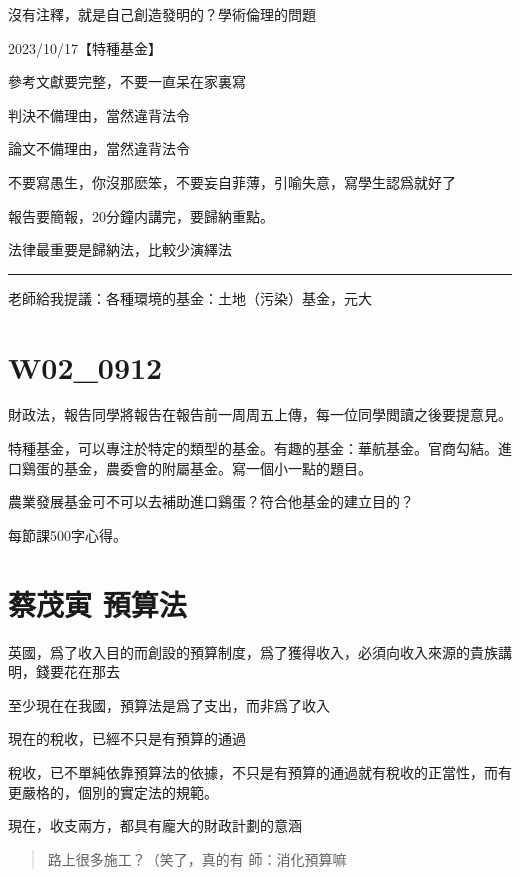 \documentclass[
]{book}
\begin{document}
沒有注釋，就是自己創造發明的？學術倫理的問題

2023/10/17【特種基金】

參考文獻要完整，不要一直呆在家裏寫

判決不備理由，當然違背法令

論文不備理由，當然違背法令

不要寫愚生，你沒那麽笨，不要妄自菲薄，引喻失意，寫學生認爲就好了

報告要簡報，20分鐘内講完，要歸納重點。

法律最重要是歸納法，比較少演繹法

\begin{center}\rule{0.5\linewidth}{0.5pt}\end{center}

老師給我提議：各種環境的基金：土地（污染）基金，元大

\hypertarget{ux7b2cux4e8cux5468}{%
\chapter{W02\_0912}\label{ux7b2cux4e8cux5468}}

財政法，報告同學將報告在報告前一周周五上傳，每一位同學閲讀之後要提意見。

特種基金，可以專注於特定的類型的基金。有趣的基金：華航基金。官商勾結。進口鷄蛋的基金，農委會的附屬基金。寫一個小一點的題目。

農業發展基金可不可以去補助進口鷄蛋？符合他基金的建立目的？

每節課500字心得。

\hypertarget{ux8521ux8302ux5bc5-ux9810ux7b97ux6cd5}{%
\chapter{蔡茂寅 預算法}\label{ux8521ux8302ux5bc5-ux9810ux7b97ux6cd5}}

英國，爲了收入目的而創設的預算制度，爲了獲得收入，必須向收入來源的貴族講明，錢要花在那去

至少現在在我國，預算法是爲了支出，而非爲了收入

現在的稅收，已經不只是有預算的通過

稅收，已不單純依靠預算法的依據，不只是有預算的通過就有稅收的正當性，而有更嚴格的，個別的實定法的規範。

現在，收支兩方，都具有龐大的財政計劃的意涵

\begin{quote}
路上很多施工？（笑了，真的有
師：消化預算嘛
\end{quote}
\end{document}
